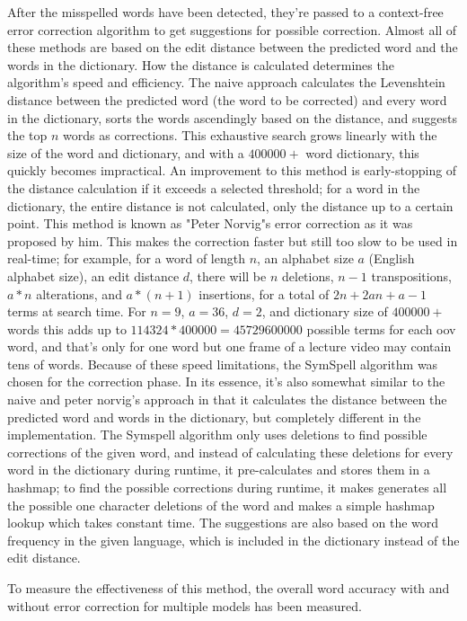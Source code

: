 After the misspelled words have been detected, they're passed to a context-free error correction algorithm to get suggestions for possible correction. Almost all of these methods are based on the edit distance between the predicted word and the words in the dictionary. How the distance is calculated determines the algorithm's speed and efficiency. The naive approach calculates the Levenshtein distance between the predicted word (the word to be corrected) and every word in the dictionary, sorts the words ascendingly based on the distance, and suggests the top $n$ words as corrections. This exhaustive search grows linearly with the size of the word and dictionary, and with a $400000+$ word dictionary, this quickly becomes impractical. An improvement to this method is early-stopping of the distance calculation if it exceeds a selected threshold; for a word in the dictionary, the entire distance is not calculated, only the distance up to a certain point. This method is known as "Peter Norvig"s error correction as it was proposed by him. This makes the correction faster but still too slow to be used in real-time; for example, for a word of length $n$, an alphabet size $a$ (English alphabet size), an edit distance $d$, there will be $n$ deletions, $n-1$ transpositions, $a * n$ alterations, and $a * (n+1)$ insertions, for a total of $2n+2an+a-1$ terms at search time. For $n=9$, $a=36$, $d=2$, and dictionary size of $400000+$ words this adds up to $114324 * 400000 = 45729600000$ possible terms for each \gls{oov} word, and that's only for one word but one frame of a lecture video may contain tens of words. Because of these speed limitations, the SymSpell algorithm \cite{wolf_1000x_2012} was chosen for the correction phase. In its essence, it's also somewhat similar to the naive and peter norvig's approach in that it calculates the distance between the predicted word and words in the dictionary, but completely different in the implementation. The Symspell algorithm only uses deletions to find possible corrections of the given word, and instead of calculating these deletions for every word in the dictionary during runtime, it pre-calculates and stores them in a hashmap; to find the possible corrections during runtime, it makes generates all the possible one character deletions of the word and makes a simple hashmap lookup which takes constant time. The suggestions are also based on the word frequency in the given language, which is included in the dictionary instead of the edit distance.

To measure the effectiveness of this method, the overall word accuracy with and without error correction for multiple models has been measured.

